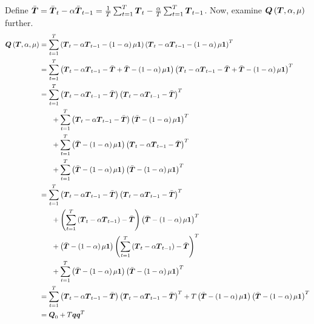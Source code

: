 \documentclass{article}\usepackage[]{graphicx}\usepackage[]{color}
\def\bm#1{\mbox{\boldmath $#1$}}
\begin{document}
%
Define $\bar{\bm{T}} = \bar{\bm{T}}_t - \alpha \bar{\bm{T}}_{t - 1} = \frac{1} {T} \sum_{t = 1}^T \bm{T}_t - \frac{\alpha} {T} \sum_{t = 1}^T \bm{T}_{t - 1} $. Now, examine $\bm{Q} \left(\bm{T}, \alpha, \mu \right)$ further.
%
\begin{align*}
%
\bm{Q} \left(\bm{T}, \alpha, \mu \right) & = \sum_{t = 1}^T \left( \bm{T}_t  - \alpha \bm{T}_{t - 1} - \left( 1 - \alpha \right) \mu \bm{1} \right) \left( \bm{T}_t  - \alpha \bm{T}_{t - 1} - \left( 1 - \alpha \right) \mu \bm{1} \right)^T\\
%
& = \sum_{t = 1}^T \left( \bm{T}_t  - \alpha \bm{T}_{t - 1} - \bar{\bm{T}} + \bar{\bm{T}} - \left( 1 - \alpha \right) \mu \bm{1} \right) \left( \bm{T}_t  - \alpha \bm{T}_{t - 1} - \bar{\bm{T}} + \bar{\bm{T}} - \left( 1 - \alpha \right) \mu \bm{1} \right)^T\\
%
& = \sum_{t = 1}^T \left( \bm{T}_t  - \alpha \bm{T}_{t - 1} - \bar{\bm{T}} \right) \left( \bm{T}_t  - \alpha \bm{T}_{t - 1} - \bar{\bm{T}} \right)^T\\
& \hspace{6mm} + \sum_{t = 1}^T \left( \bm{T}_t  - \alpha \bm{T}_{t - 1} - \bar{\bm{T}} \right) \left( \bar{\bm{T}} - \left( 1 - \alpha \right) \mu \bm{1} \right)^T\\
& \hspace{6mm} + \sum_{t = 1}^T \left( \bar{\bm{T}} - \left( 1 - \alpha \right) \mu \bm{1} \right) \left( \bm{T}_t  - \alpha \bm{T}_{t - 1} - \bar{\bm{T}} \right)^T\\
& \hspace{6mm} + \sum_{t = 1}^T \left( \bar{\bm{T}} - \left( 1 - \alpha \right) \mu \bm{1} \right) \left( \bar{\bm{T}} - \left( 1 - \alpha \right) \mu \bm{1} \right)^T\\
%
& = \sum_{t = 1}^T \left( \bm{T}_t  - \alpha \bm{T}_{t - 1} - \bar{\bm{T}} \right) \left( \bm{T}_t  - \alpha \bm{T}_{t - 1} - \bar{\bm{T}} \right)^T\\
& \hspace{6mm} + \left( \sum_{t = 1}^T \left( \bm{T}_t  - \alpha \bm{T}_{t - 1} \right) - \bar{\bm{T}} \right) \left( \bar{\bm{T}} - \left( 1 - \alpha \right) \mu \bm{1} \right)^T\\
& \hspace{6mm} + \left( \bar{\bm{T}} - \left( 1 - \alpha \right) \mu \bm{1} \right) \left( \sum_{t = 1}^T \left( \bm{T}_t  - \alpha \bm{T}_{t - 1} \right) - \bar{\bm{T}} \right)^T\\
& \hspace{6mm} + \sum_{t = 1}^T \left( \bar{\bm{T}} - \left( 1 - \alpha \right) \mu \bm{1} \right) \left( \bar{\bm{T}} - \left( 1 - \alpha \right) \mu \bm{1} \right)^T\\
%
& = \sum_{t = 1}^T \left( \bm{T}_t  - \alpha \bm{T}_{t - 1} - \bar{\bm{T}} \right) \left( \bm{T}_t  - \alpha \bm{T}_{t - 1} - \bar{\bm{T}} \right)^T + T \left( \bar{\bm{T}} - \left( 1 - \alpha \right) \mu \bm{1} \right) \left( \bar{\bm{T}} - \left( 1 - \alpha \right) \mu \bm{1} \right)^T\\
%
& = \bm{Q}_0 + T \bm{q} \bm{q}^T
%
\end{align*}
\end{document}

